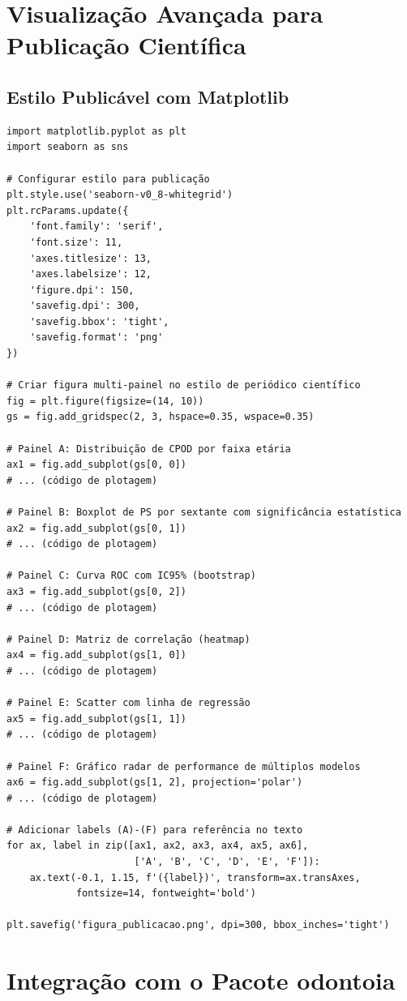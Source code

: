 \section{Visualização Avançada para Publicação Científica}

\subsection{Estilo Publicável com Matplotlib}

\begin{verbatim}
import matplotlib.pyplot as plt
import seaborn as sns

# Configurar estilo para publicação
plt.style.use('seaborn-v0_8-whitegrid')
plt.rcParams.update({
    'font.family': 'serif',
    'font.size': 11,
    'axes.titlesize': 13,
    'axes.labelsize': 12,
    'figure.dpi': 150,
    'savefig.dpi': 300,
    'savefig.bbox': 'tight',
    'savefig.format': 'png'
})

# Criar figura multi-painel no estilo de periódico científico
fig = plt.figure(figsize=(14, 10))
gs = fig.add_gridspec(2, 3, hspace=0.35, wspace=0.35)

# Painel A: Distribuição de CPOD por faixa etária
ax1 = fig.add_subplot(gs[0, 0])
# ... (código de plotagem)

# Painel B: Boxplot de PS por sextante com significância estatística
ax2 = fig.add_subplot(gs[0, 1])
# ... (código de plotagem)

# Painel C: Curva ROC com IC95% (bootstrap)
ax3 = fig.add_subplot(gs[0, 2])
# ... (código de plotagem)

# Painel D: Matriz de correlação (heatmap)
ax4 = fig.add_subplot(gs[1, 0])
# ... (código de plotagem)

# Painel E: Scatter com linha de regressão
ax5 = fig.add_subplot(gs[1, 1])
# ... (código de plotagem)

# Painel F: Gráfico radar de performance de múltiplos modelos
ax6 = fig.add_subplot(gs[1, 2], projection='polar')
# ... (código de plotagem)

# Adicionar labels (A)-(F) para referência no texto
for ax, label in zip([ax1, ax2, ax3, ax4, ax5, ax6],
                      ['A', 'B', 'C', 'D', 'E', 'F']):
    ax.text(-0.1, 1.15, f'({label})', transform=ax.transAxes,
            fontsize=14, fontweight='bold')

plt.savefig('figura_publicacao.png', dpi=300, bbox_inches='tight')
\end{verbatim}

\section{Integração com o Pacote odontoia}

